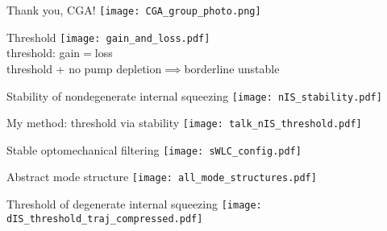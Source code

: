 \documentclass[12pt,xcolor=dvipsnames]{beamer}
\begin{document}
{
	\begin{frame}[noframenumbering]{Thank you, CGA!}
	\centering
	\vspace*{-1.5cm}
	\texttt{[image: CGA\_group\_photo.png]}
	\end{frame}
}



\begin{frame}[noframenumbering]{Threshold}
\centering
\texttt{[image: gain\_and\_loss.pdf]}
\\\vspace*{1cm}
\large{threshold: gain$=$loss}
\\\vspace*{0.5cm}threshold + no pump depletion$\implies$borderline unstable
\end{frame}

\begin{frame}[noframenumbering]{Stability of nondegenerate internal squeezing}
\centering
\texttt{[image: nIS\_stability.pdf]}
\end{frame}

\begin{frame}[noframenumbering]{My method: threshold via stability}
\centering
\texttt{[image: talk\_nIS\_threshold.pdf]}
\end{frame}

\begin{frame}[noframenumbering]{Stable optomechanical filtering}
\centering
\texttt{[image: sWLC\_config.pdf]}
\end{frame}

\begin{frame}[noframenumbering]{Abstract mode structure}
\centering
\texttt{[image: all\_mode\_structures.pdf]}
\end{frame}

\begin{frame}[noframenumbering]{Threshold of degenerate internal squeezing}
\centering
\texttt{[image: dIS\_threshold\_traj\_compressed.pdf]}
\end{frame}
\end{document}
